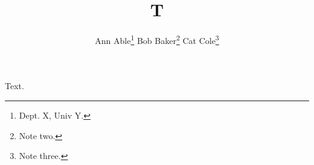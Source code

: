 \documentclass{article}
\begin{document}
\title{T}
\author{Ann Able\thanks{Dept. X, Univ Y.} \qquad Bob Baker\thanks{Note two.} \qquad Cat Cole\thanks{Note three.}}
\maketitle
Text.
\end{document}
